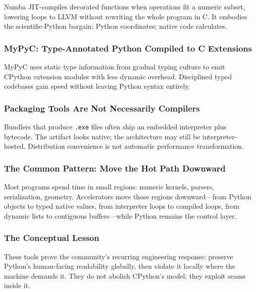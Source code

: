 Numba JIT-compiles decorated functions when operations fit a numeric subset, lowering loops to LLVM without rewriting the whole program in C. It embodies the scientific-Python bargain: Python coordinates; native code calculates.

\subsubsection{MyPyC: Type-Annotated Python Compiled to C Extensions}

MyPyC uses static type information from gradual typing culture to emit CPython extension modules with less dynamic overhead. Disciplined typed codebases gain speed without leaving Python syntax entirely.

\subsubsection{Packaging Tools Are Not Necessarily Compilers}

Bundlers that produce \texttt{.exe} files often ship an embedded interpreter plus bytecode. The artifact looks native; the architecture may still be interpreter-hosted. Distribution convenience is not automatic performance transformation.

\subsubsection{The Common Pattern: Move the Hot Path Downward}

Most programs spend time in small regions: numeric kernels, parsers, serialization, geometry. Accelerators move those regions downward---from Python objects to typed native values, from interpreter loops to compiled loops, from dynamic lists to contiguous buffers---while Python remains the control layer.

\subsubsection{The Conceptual Lesson}

These tools prove the community's recurring engineering response: preserve Python's human-facing readability globally, then violate it locally where the machine demands it. They do not abolish CPython's model; they exploit seams inside it.
